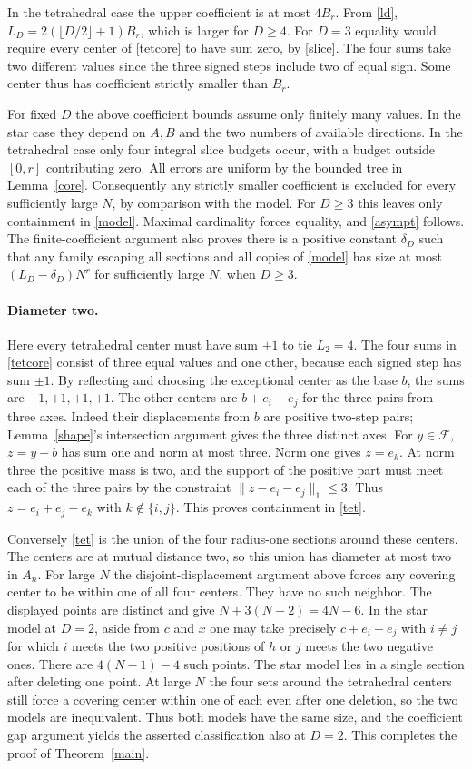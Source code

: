 \documentclass[10pt]{article}
\newcommand{\F}{\mathcal F}
\newcommand{\norm}[1]{\lVert #1\rVert_1}
\begin{document}
In the tetrahedral case the upper coefficient is at most $4B_r$. From \eqref{ld}, $L_D=2(\lfloor D/2\rfloor+1)B_r$, which is larger for $D\ge4$. For $D=3$ equality would require every center of \eqref{tetcore} to have sum zero, by \eqref{slice}. The four sums take two different values since the three signed steps include two of equal sign. Some center thus has coefficient strictly smaller than $B_r$.

For fixed $D$ the above coefficient bounds assume only finitely many values. In the star case they depend on $A,B$ and the two numbers of available directions. In the tetrahedral case only four integral slice budgets occur, with a budget outside $[0,r]$ contributing zero. All errors are uniform by the bounded tree in Lemma~\ref{core}. Consequently any strictly smaller coefficient is excluded for every sufficiently large $N$, by comparison with the model. For $D\ge3$ this leaves only containment in \eqref{model}. Maximal cardinality forces equality, and \eqref{asympt} follows. The finite-coefficient argument also proves there is a positive constant $\delta_D$ such that any family escaping all sections and all copies of \eqref{model} has size at most $(L_D-\delta_D)N^r$ for sufficiently large $N$, when $D\ge3$.

\paragraph{Diameter two.}
Here every tetrahedral center must have sum $\pm1$ to tie $L_2=4$. The four sums in \eqref{tetcore} consist of three equal values and one other, because each signed step has sum $\pm1$. By reflecting and choosing the exceptional center as the base $b$, the sums are $-1,+1,+1,+1$. The other centers are $b+e_i+e_j$ for the three pairs from three axes. Indeed their displacements from $b$ are positive two-step pairs; Lemma~\ref{shape}'s intersection argument gives the three distinct axes. For $y\in\F$, $z=y-b$ has sum one and norm at most three. Norm one gives $z=e_k$. At norm three the positive mass is two, and the support of the positive part must meet each of the three pairs by the constraint $\norm{z-e_i-e_j}\le3$. Thus $z=e_i+e_j-e_k$ with $k\notin\{i,j\}$. This proves containment in \eqref{tet}.

Conversely \eqref{tet} is the union of the four radius-one sections around these centers. The centers are at mutual distance two, so this union has diameter at most two in $A_n$. For large $N$ the disjoint-displacement argument above forces any covering center to be within one of all four centers. They have no such neighbor. The displayed points are distinct and give $N+3(N-2)=4N-6$. In the star model at $D=2$, aside from $c$ and $x$ one may take precisely $c+e_i-e_j$ with $i\ne j$ for which $i$ meets the two positive positions of $h$ or $j$ meets the two negative ones. There are $4(N-1)-4$ such points. The star model lies in a single section after deleting one point. At large $N$ the four sets around the tetrahedral centers still force a covering center within one of each even after one deletion, so the two models are inequivalent. Thus both models have the same size, and the coefficient gap argument yields the asserted classification also at $D=2$. This completes the proof of Theorem~\ref{main}.
\end{document}
